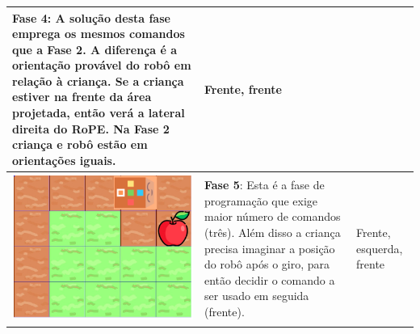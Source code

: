 \begin{quadro}[htbp]
\begin{longtable}{ | m{} | m{} | m{} | }
        \textbf{Fase 4}:
        A solução desta fase emprega os mesmos comandos que a Fase 2. A diferença é a orientação provável do robô em relação à criança. Se a criança estiver na frente da área projetada, então verá a lateral direita do RoPE. Na Fase 2 criança e robô estão em orientações iguais. &

        Frente, frente
        
        \\ \hline
    
    
        \includegraphics[width=.9\linewidth]{figs/prog/5.png} &
    
        \textbf{Fase 5}: 
        Esta é a fase de programação que exige maior número de comandos (três). Além disso a criança precisa imaginar a posição do robô após o giro, para então decidir o comando a ser usado em seguida (frente).
        &
        Frente, esquerda, frente 
        
        \\ \hline
        
    \end{longtable}
\end{quadro}

